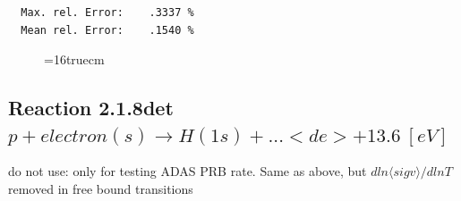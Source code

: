 \documentclass[12pt,dvips]{article}
\begin{document}
\begin{small}
\begin{verbatim}
  Max. rel. Error:    .3337 %
  Mean rel. Error:    .1540 %

\end{verbatim}\end{small}
\begin{figure} \label{2.1.8lr2}
\epsfxsize=16truecm
\end{figure}
\newpage

\subsection{
  Reaction 2.1.8det  $p + electron(s) \rightarrow H(1s) + ...   <de>+13.6 \ [eV] $
}

     do not use: only for testing  ADAS PRB rate. Same as above,
     but $dln\langle sig v\rangle /dlnT$ removed in free bound transitions
\end{document}

